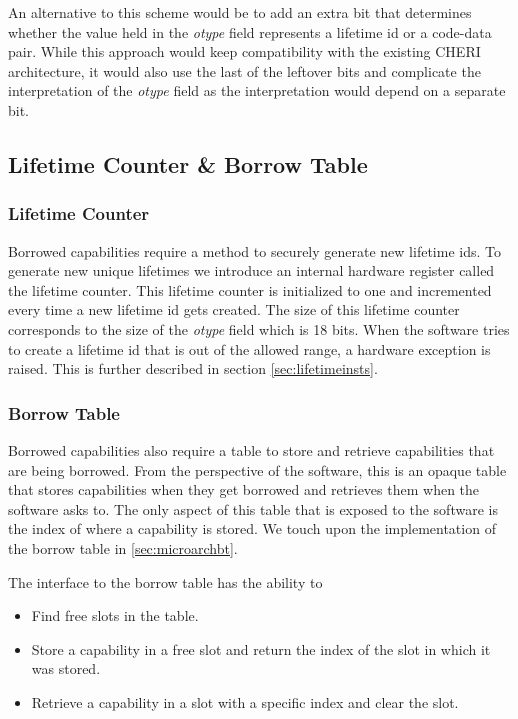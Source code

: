 An alternative to this scheme would be to add an extra bit that determines whether the value held in the \textit{otype} field represents a lifetime id or a code-data pair. While this approach would keep compatibility with the existing CHERI architecture, it would also use the last of the leftover bits and complicate the interpretation of the \textit{otype} field as the interpretation would depend on a separate bit.

\subsection{Lifetime Counter \& Borrow Table}
\label{sec:lcbt}
\subsubsection{Lifetime Counter}
Borrowed capabilities require a method to securely generate new lifetime ids. To generate new unique lifetimes we introduce an internal hardware register called the lifetime counter. This lifetime counter is initialized to one and incremented every time a new lifetime id gets created. The size of this lifetime counter corresponds to the size of the \textit{otype} field which is 18 bits. When the software tries to create a lifetime id that is out of the allowed range, a hardware exception is raised. This is further described in section \ref{sec:lifetimeinsts}.

\subsubsection{Borrow Table}
Borrowed capabilities also require a table to store and retrieve capabilities that are being borrowed. From the perspective of the software, this is an opaque table that stores capabilities when they get borrowed and retrieves them when the software asks to. The only aspect of this table that is exposed to the software is the index of where a capability is stored. We touch upon the implementation of the borrow table in \ref{sec:microarchbt}.

The interface to the borrow table has the ability to
\begin{itemize}
\item Find free slots in the table.
\item Store a capability in a free slot and return the index of the slot in which it was stored.
\item Retrieve a capability in a slot with a specific index and clear the slot.
\end{itemize}

